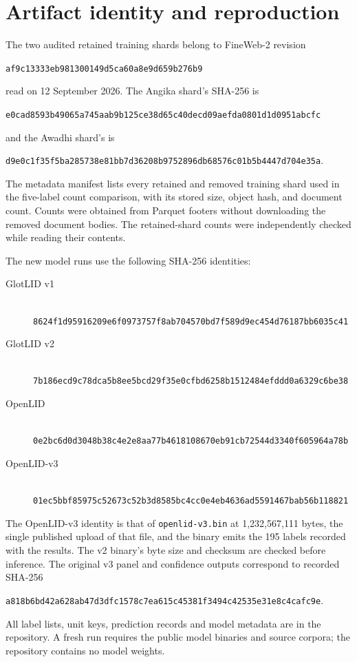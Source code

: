 \documentclass[final]{clv2025}
\begin{document}
\FloatBarrier
\section{Artifact identity and reproduction}\label{app:repro}

The two audited retained training shards belong to FineWeb-2 revision
\begin{center}\small\nolinkurl{af9c13333eb981300149d5ca60a8e9d659b276b9}\end{center}
read on 12 September 2026. The Angika shard's SHA-256 is
\begin{center}\small\nolinkurl{e0cad8593b49065a745aab9b125ce38d65c40decd09aefda0801d1d0951abcfc}\end{center}
and the Awadhi shard's is
\begin{center}\small\nolinkurl{d9e0c1f35f5ba285738e81bb7d36208b9752896db68576c01b5b4447d704e35a}.\end{center}
The metadata manifest lists every retained and removed training shard used in the five-label count comparison, with its stored size, object hash, and document count. Counts were obtained from Parquet footers without downloading the removed document bodies. The retained-shard counts were independently checked while reading their contents.

The new model runs use the following SHA-256 identities:
\begin{description}
\item[GlotLID v1] \hfill\\\nolinkurl{8624f1d95916209e6f0973757f8ab704570bd7f589d9ec454d76187bb6035c41}
\item[GlotLID v2] \hfill\\\nolinkurl{7b186ecd9c78dca5b8ee5bcd29f35e0cfbd6258b1512484efddd0a6329c6be38}
\item[OpenLID] \hfill\\\nolinkurl{0e2bc6d0d3048b38c4e2e8aa77b4618108670eb91cb72544d3340f605964a78b}
\item[OpenLID-v3] \hfill\\\nolinkurl{01ec5bbf85975c52673c52b3d8585bc4cc0e4eb4636ad5591467bab56b118821}
\end{description}
The OpenLID-v3 identity is that of \nolinkurl{openlid-v3.bin} at 1{,}232{,}567{,}111 bytes, the single published upload of that file, and the binary emits the 195 labels recorded with the results.
The v2 binary's byte size and checksum are checked before inference. The original v3 panel and confidence outputs correspond to recorded SHA-256
\begin{center}\small\nolinkurl{a818b6bd42a628ab47d3dfc1578c7ea615c45381f3494c42535e31e8c4cafc9e}.\end{center}
All label lists, unit keys, prediction records and model metadata are in the repository. A fresh run requires the public model binaries and source corpora; the repository contains no model weights.
\end{document}
